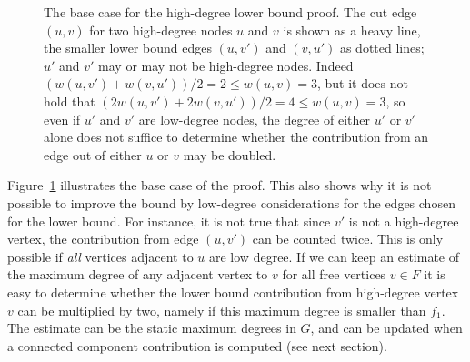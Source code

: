 \documentclass[a4paper,11pt]{article}
\begin{document}
\begin{figure}
\centering
{}
\caption{The base case for the high-degree lower bound proof. The cut
  edge $(u,v)$ for two high-degree nodes $u$ and $v$ is shown as a
  heavy line, the smaller lower bound edges $(u,v')$ and $(v,u')$ as
  dotted lines; $u'$ and $v'$ may or may not be high-degree
  nodes. Indeed $(w(u,v')+w(v,u'))/2 = 2\leq w(u,v)=3$, but it does
  not hold that $(2w(u,v')+2w(v,u'))/2=4\leq w(u,v)=3$, so even if
  $u'$ and $v'$ are low-degree nodes, the degree of either $u'$ or
  $v'$ alone does not suffice to determine whether the contribution
  from an edge out of either $u$ or $v$ may be doubled.}
\label{fig:highdegreecounterex}
\end{figure}

Figure~\ref{fig:highdegreecounterex} illustrates the base case of the
proof. This also shows why it is not possible to improve the bound by
low-degree considerations for the edges chosen for the lower
bound. For instance, it is not true that since $v'$ is not a
high-degree vertex, the contribution from edge $(u,v')$ can be counted
twice. This is only possible if \emph{all} vertices adjacent to $u$
are low degree. If we can keep an estimate of the maximum degree of
any adjacent vertex to $v$ for all free vertices $v\in F$ it is easy
to determine whether the lower bound contribution from high-degree
vertex $v$ can be multiplied by two, namely if this maximum degree is
smaller than $f_1$. The estimate can be the static maximum degrees in
$G$, and can be updated when a connected component contribution is
computed (see next section).
\end{document}
